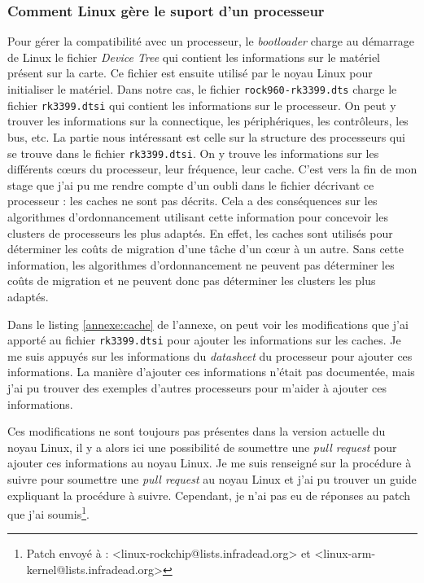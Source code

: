 \subsubsection{Comment Linux gère le suport d'un processeur}

Pour gérer la compatibilité avec un processeur, le \textit{bootloader} charge au démarrage de Linux le fichier \textit{Device Tree} qui contient les informations sur le matériel présent sur la carte. Ce fichier est ensuite utilisé par le noyau Linux pour initialiser le matériel. Dans notre cas, le fichier \texttt{rock960-rk3399.dts} charge le fichier \texttt{rk3399.dtsi} qui contient les informations sur le processeur. On peut y trouver les informations sur la connectique, les périphériques, les contrôleurs, les bus, etc.
La partie nous intéressant est celle sur la structure des processeurs qui se trouve dans le fichier \texttt{rk3399.dtsi}. On y trouve les informations sur les différents cœurs du processeur, leur fréquence, leur cache. C'est vers la fin de mon stage que j'ai pu me rendre compte d'un oubli dans le fichier décrivant ce processeur : les caches ne sont pas décrits. Cela a des conséquences sur les algorithmes d'ordonnancement utilisant cette information pour concevoir les clusters de processeurs les plus adaptés. En effet, les caches sont utilisés pour déterminer les coûts de migration d'une tâche d'un cœur à un autre. Sans cette information, les algorithmes d'ordonnancement ne peuvent pas déterminer les coûts de migration et ne peuvent donc pas déterminer les clusters les plus adaptés. 

Dans le listing \ref{annexe:cache} de l'annexe, on peut voir les modifications que j'ai apporté au fichier \texttt{rk3399.dtsi} pour ajouter les informations sur les caches. Je me suis appuyés sur les informations du \textit{datasheet} du processeur pour ajouter ces informations. La manière d'ajouter ces informations n'était pas documentée, mais j'ai pu trouver des exemples d'autres processeurs pour m'aider à ajouter ces informations.

Ces modifications ne sont toujours pas présentes dans la version actuelle du noyau Linux, il y a alors ici une possibilité de soumettre une \textit{pull request} pour ajouter ces informations au noyau Linux. Je me suis renseigné sur la procédure à suivre pour soumettre une \textit{pull request} au noyau Linux et j'ai pu trouver un guide\cite{kernel-contribute} expliquant la procédure à suivre. Cependant, je n'ai pas eu de réponses au patch que j'ai soumis\footnote{Patch envoyé à : <linux-rockchip@lists.infradead.org> et <linux-arm-kernel@lists.infradead.org>}.


